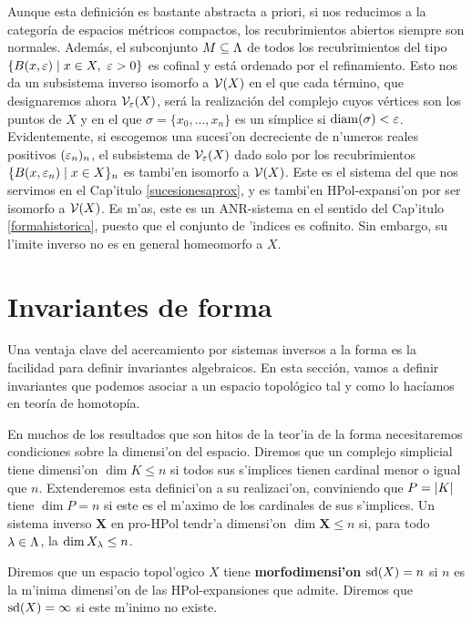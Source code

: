 Aunque esta definición es bastante abstracta a priori, si nos reducimos a la categoría de espacios métricos compactos, los recubrimientos abiertos siempre son normales. Además, el subconjunto $ M\subseteq \Lambda  $ de todos los recubrimientos del tipo $ \{B(x,\varepsilon)\mid x\in X, \ \varepsilon>0 \} $ es cofinal y está ordenado por el refinamiento. Esto nos da un subsistema inverso isomorfo a  $ \mathcal{V}(X ) $ en el que cada término, que designaremos ahora $ \mathcal{V}_\varepsilon(X)$,  será la realización del complejo cuyos vértices son los puntos de $ X  $ y en el que $ \sigma = \{x_0,...,x_n \} $ es un símplice si $ \operatorname{diam}(\sigma)<\varepsilon  $. Evidentemente, si escogemos una sucesi'on decreciente de n'umeros reales positivos $(\varepsilon_n)_n $, el subsistema de $\mathcal{V}_\varepsilon(X) $ dado solo por los recubrimientos $\{B(x,\varepsilon_n)\mid x\in X\}_n$ es tambi'en isomorfo a $\mathcal{V}(X)$. Este es el sistema del que nos servimos en el Cap'itulo \ref{sucesionesaprox}, y es tambi'en HPol-expansi'on por ser isomorfo a $\mathcal{V}(X)$. Es m'as, este es un ANR-sistema en el sentido del Cap'itulo \ref{formahistorica}, puesto que el conjunto de 'indices es cofinito. Sin embargo, su l'imite inverso no es en general homeomorfo a $X$.




\section{Invariantes de forma}

Una ventaja clave del acercamiento por sistemas inversos a la forma es la facilidad para definir invariantes algebraicos. En esta sección, vamos a definir  invariantes que podemos asociar a un espacio topológico tal y como lo hacíamos en teoría de homotopía. 

En muchos de los resultados que son hitos de la teor'ia de la forma necesitaremos condiciones sobre la dimensi'on del espacio. Diremos que un complejo simplicial tiene dimensi'on $ \dim K\leq n  $ si todos sus s'implices tienen cardinal menor o igual que $ n  $. Extenderemos esta definici'on a su realizaci'on, conviniendo que  $ P = \abs{K } $ tiene $ \dim P = n  $ si este es el m'aximo de los cardinales de sus s'implices. Un sistema inverso $ \mathbf{X}$ en pro-HPol tendr'a dimensi'on $ \dim \mathbf{X}\leq n$ si, para todo $ \lambda\in \Lambda  $, la $ \dim X_\lambda \leq n  $.
\begin{definition}
  Diremos que un espacio topol'ogico $ X  $ tiene \textbf{morfodimensi'on} $ \operatorname{sd}(X)= n  $ si $ n  $ es la m'inima dimensi'on de las HPol-expansiones que admite. Diremos que $ \operatorname{sd}(X) = \infty  $ si este m'inimo no existe.
\end{definition}


